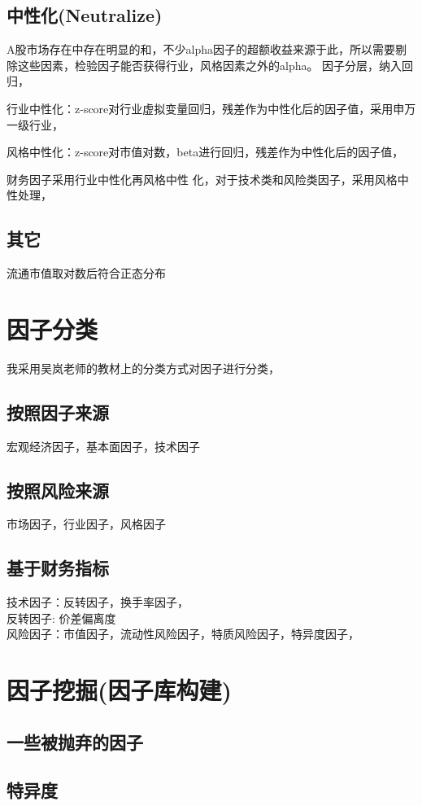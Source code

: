 \documentclass[12pt]{article}
\theoremstyle{definition}
\begin{document}
\subsection{中性化(Neutralize)}
A股市场存在中存在明显的和，不少alpha因子的超额收益来源于此，所以需要剔除这些因素，检验因子能否获得行业，风格因素之外的alpha。
因子分层，纳入回归，\par
行业中性化：z-score对行业虚拟变量回归，残差作为中性化后的因子值，采用申万一级行业，\par
风格中性化：z-score对市值对数，beta进行回归，残差作为中性化后的因子值，\par
财务因子采用行业中性化再风格中性         化，对于技术类和风险类因子，采用风格中性处理，

\subsection{其它}
流通市值取对数后符合正态分布


\section{因子分类}
我采用吴岚老师的教材上的分类方式对因子进行分类，
\subsection{按照因子来源}
宏观经济因子，基本面因子，技术因子
\subsection{按照风险来源}
市场因子，行业因子，风格因子
\subsection{基于财务指标}
技术因子：反转因子，换手率因子， \\
反转因子: 价差偏离度 \\
风险因子：市值因子，流动性风险因子，特质风险因子，特异度因子，\\

\section{因子挖掘(因子库构建)}
\subsection{一些被抛弃的因子}
\subsection{特异度}
\end{document}
